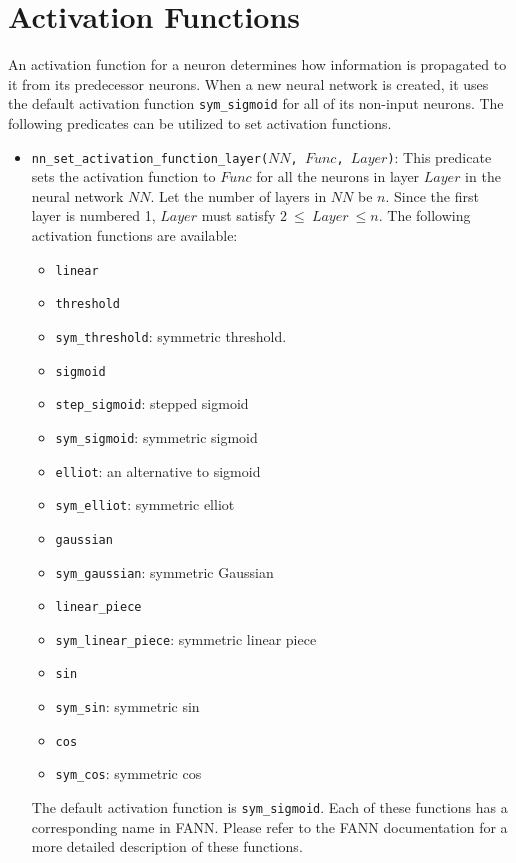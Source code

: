\section{Activation Functions}
An activation function for a neuron determines how information is propagated to it from its predecessor neurons. When a new neural network is created, it uses the default activation function \texttt{sym\_sigmoid} for all of its non-input neurons. The following predicates can be utilized to set activation functions.

\begin{itemize}
\item \texttt{nn\_set\_activation\_function\_layer($NN$, $Func$, $Layer$)}: This predicate sets the activation function to $Func$ for all the neurons in layer $Layer$ in the neural network $NN$. Let the number of layers in $NN$ be $n$. Since the first layer is numbered 1, $Layer$ must satisfy $2\ \le\ Layer\ \le n$. The following activation functions are available:
\begin{itemize}
\item \texttt{linear}
\item \texttt{threshold}
\item \texttt{sym\_threshold}: symmetric threshold.
\item \texttt{sigmoid}
\item \texttt{step\_sigmoid}: stepped sigmoid
\item \texttt{sym\_sigmoid}: symmetric sigmoid
\item \texttt{elliot}: an alternative to sigmoid
\item \texttt{sym\_elliot}: symmetric elliot
\item \texttt{gaussian}
\item \texttt{sym\_gaussian}: symmetric Gaussian
\item \texttt{linear\_piece}
\item \texttt{sym\_linear\_piece}: symmetric linear piece
\item \texttt{sin}
\item \texttt{sym\_sin}: symmetric sin
\item \texttt{cos}
\item \texttt{sym\_cos}: symmetric cos
\end{itemize}
The default activation function is \texttt{sym\_sigmoid}. Each of these functions has a corresponding name in FANN. Please refer to the FANN documentation for a more detailed description of these functions.


\end{itemize}
